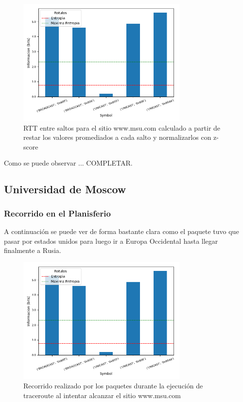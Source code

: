 \begin{figure}[H]
  \centering
  \includegraphics[width=8.5cm]{figs/information_hogar_ethernet_S1_output.png}
  \caption{\normalfont RTT entre saltos para el sitio www.msu.com calculado a partir de restar los valores promediados a cada salto y normalizarlos con z-score}
\end{figure}

Como se puede observar ... COMPLETAR.


\subsection*{Universidad de Moscow}

\subsubsection*{Recorrido en el Planisferio}

A continuación se puede ver de forma bastante clara como el paquete tuvo que pasar por estados unidos para luego ir a Europa Occidental hasta llegar finalmente a Rusia.

\begin{figure}[H]
  \centering
  \includegraphics[width=8.5cm]{figs/information_hogar_ethernet_S1_output.png}
  \caption{\normalfont Recorrido realizado por los paquetes durante la ejecución de traceroute al intentar alcanzar el sitio www.msu.com}
\end{figure}

